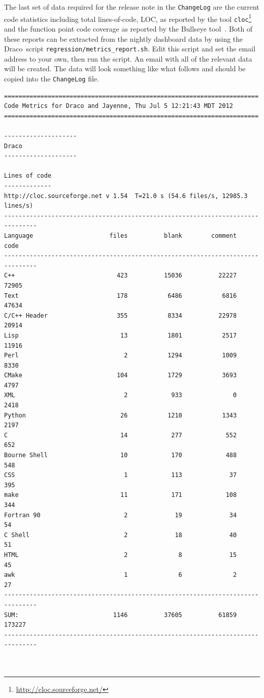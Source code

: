 \documentclass[note]{newmemo}
\newcommand{\draco}{{\normalfont\small\sffamily Draco}}
\begin{document}
The last set of data required for the release note in the
\texttt{ChangeLog} are the current code statistics including total
lines-of-code, LOC, as reported by the tool
\texttt{cloc}\footnote{\url{http://cloc.sourceforge.net/}} and the function point code coverage as
reported by the Bullseye tool~\cite{bullseyeweb}.  Both of these reports can be extracted from the nightly dashboard data by using the \draco\ script \texttt{regression/metrics\_report.sh}.  Edit this script and set the email address to your own, then run the script.  An email with all of the relevant data will be created.  The data will look something like what follows and should be copied into the \texttt{ChangeLog} file.
%
\begin{lstlisting}[basicstyle=\footnotesize, xleftmargin=0.5in, 
  xrightmargin=0.5in]
======================================================================
Code Metrics for Draco and Jayenne, Thu Jul 5 12:21:43 MDT 2012
======================================================================
 
--------------------
Draco
--------------------
 
Lines of code
-------------
http://cloc.sourceforge.net v 1.54  T=21.0 s (54.6 files/s, 12985.3 lines/s)
-------------------------------------------------------------------------------
Language                     files          blank        comment           code
-------------------------------------------------------------------------------
C++                            423          15036          22227          72905
Text                           178           6486           6816          47634
C/C++ Header                   355           8334          22978          20914
Lisp                            13           1801           2517          11916
Perl                             2           1294           1009           8330
CMake                          104           1729           3693           4797
XML                              2            933              0           2418
Python                          26           1210           1343           2197
C                               14            277            552            652
Bourne Shell                    10            170            488            548
CSS                              1            113             37            395
make                            11            171            108            344
Fortran 90                       2             19             34             54
C Shell                          2             18             40             51
HTML                             2              8             15             45
awk                              1              6              2             27
-------------------------------------------------------------------------------
SUM:                          1146          37605          61859         173227
-------------------------------------------------------------------------------



\end{lstlisting}
\end{document}
